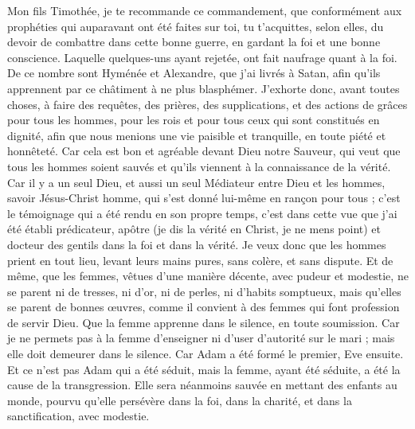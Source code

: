 \begin{multicols}{2}
Mon fils Timothée, je te recommande ce commandement, que conformément aux prophéties qui auparavant ont été faites sur toi, tu t'acquittes, selon elles, du devoir de combattre dans cette bonne guerre,
en gardant la foi et une bonne conscience. Laquelle quelques-uns ayant rejetée, ont fait naufrage quant à la foi.
De ce nombre sont Hyménée et Alexandre, que j'ai livrés à Satan, afin qu'ils apprennent par ce châtiment à ne plus blasphémer.
\VerseOne{}J'exhorte donc, avant toutes choses, à faire des requêtes, des prières, des supplications, et des actions de grâces pour tous les hommes,
pour les rois et pour tous ceux qui sont constitués en dignité, afin que nous menions une vie paisible et tranquille, en toute piété et honnêteté.
Car cela est bon et agréable devant Dieu notre Sauveur,
qui veut que tous les hommes soient sauvés et qu'ils viennent à la connaissance de la vérité.
Car il y a un seul Dieu, et aussi un seul Médiateur entre Dieu et les hommes, savoir Jésus-Christ homme,
qui s'est donné lui-même en rançon pour tous ; c’est le témoignage qui a été rendu en son propre temps,
c'est dans cette vue que j'ai été établi prédicateur, apôtre (je dis la vérité en Christ, je ne mens point) et docteur des gentils dans la foi et dans la vérité.
Je veux donc que les hommes prient en tout lieu, levant leurs mains pures, sans colère, et sans dispute.
Et de même, que les femmes, vêtues d’une manière décente, avec pudeur et modestie, ne se parent ni de tresses, ni d’or, ni de perles, ni d’habits somptueux,
mais qu'elles se parent de bonnes œuvres, comme il convient à des femmes qui font profession de servir Dieu.
Que la femme apprenne dans le silence, en toute soumission.
Car je ne permets pas à la femme d'enseigner ni d'user d'autorité sur le mari ; mais elle doit demeurer dans le silence.
Car Adam a été formé le premier, Eve ensuite.
Et ce n'est pas Adam qui a été séduit, mais la femme, ayant été séduite, a été la cause de la transgression.
Elle sera néanmoins sauvée en mettant des enfants au monde, pourvu qu'elle persévère dans la foi, dans la charité, et dans la sanctification, avec modestie.

\end{multicols}
